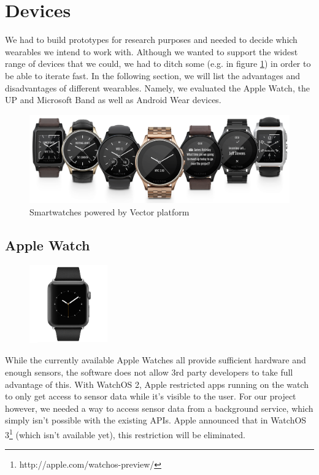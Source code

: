 \section{Devices}
\label{sec:devices}

We had to build prototypes for research purposes and needed to decide which wearables we intend to work with.
Although we wanted to support the widest range of devices that we could, we had to ditch some (e.g. in figure \ref{fig:devices}) in order to be able to iterate fast.
In the following section, we will list the advantages and disadvantages of different wearables.
Namely, we evaluated the Apple Watch, the UP and Microsoft Band as well as Android Wear devices.

\begin{figure}[H]
	\begin{center}
		\includegraphics[width=0.8\linewidth]{images/devices_vectorwatches.png}
		\caption[Caption for devices]{Smartwatches powered by Vector platform\footnotemark}
		\label{fig:devices}
	\end{center}
\end{figure}

\subsection{Apple Watch}
\begin{figure}
	\begin{center}
		\includegraphics[width=0.3\textwidth]{images/device_applewatch.png}
	\end{center}
\end{figure}
While the currently available Apple Watches all provide sufficient hardware and enough sensors, the software does not allow 3rd party developers to take full advantage of this.
With WatchOS 2, Apple restricted apps running on the watch to only get access to sensor data while it's visible to the user.
For our project however, we needed a way to access sensor data from a background service, which simply isn't possible with the existing APIs.
Apple announced that in WatchOS 3\footnote{http://apple.com/watchos-preview/} (which isn't available yet), this restriction will be eliminated. 

